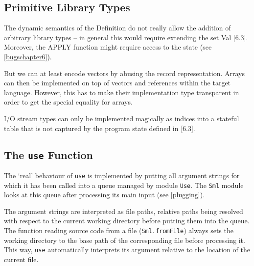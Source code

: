 \documentclass[twoside,titlepage]{article}
\newcommand{\void}[1]{}
\begin{document}


\subsection{Primitive Library Types}
\label{primtypes}

The dynamic semantics of the Definition do not really allow the addition of arbitrary library types -- in general this would require extending the set Val [6.3]. Moreover, the APPLY function might require access to the state (see \ref{bugschapter6}).

But we can at least encode vectors by abusing the record representation. Arrays can then be implemented on top of vectors and references within the target language. However, this has to make their implementation type transparent in order to get the special equality for arrays.\void{\footnote{Although HaMLet already generalises the special equality characteristics of references (see \ref{tynames}) we do not currently use that for arrays because it would require making them primitive.}}

I/O stream types can only be implemented magically as indices into a stateful table that is not captured by the program state defined in [6.3].


\subsection{The {\tt use} Function}
\label{use}

The `real' behaviour of {\tt use} is implemented by putting all argument strings for which it has been called into a queue managed by module {\tt Use}. The {\tt Sml} module looks at this queue after processing its main input (see \ref{plugging}).

The argument strings are interpreted as file paths, relative paths being resolved with respect to the current working directory before putting them into the queue. The function reading source code from a file ({\tt Sml.fromFile}) always sets the working directory to the base path of the corresponding file before processing it. This way, {\tt use} automatically interprets its argument relative to the location of the current file.
\end{document}
